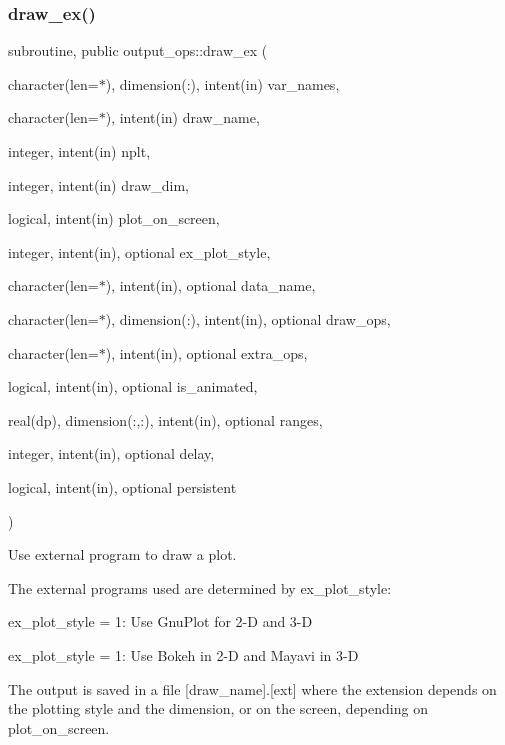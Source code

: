 \subsubsection{\texorpdfstring{draw\+\_\+ex()}{draw\_ex()}}
{\footnotesize\ttfamily subroutine, public output\+\_\+ops\+::draw\+\_\+ex (\begin{DoxyParamCaption}\item[{character(len=$\ast$), dimension(\+:), intent(in)}]{var\+\_\+names,  }\item[{character(len=$\ast$), intent(in)}]{draw\+\_\+name,  }\item[{integer, intent(in)}]{nplt,  }\item[{integer, intent(in)}]{draw\+\_\+dim,  }\item[{logical, intent(in)}]{plot\+\_\+on\+\_\+screen,  }\item[{integer, intent(in), optional}]{ex\+\_\+plot\+\_\+style,  }\item[{character(len=$\ast$), intent(in), optional}]{data\+\_\+name,  }\item[{character(len=$\ast$), dimension(\+:), intent(in), optional}]{draw\+\_\+ops,  }\item[{character(len=$\ast$), intent(in), optional}]{extra\+\_\+ops,  }\item[{logical, intent(in), optional}]{is\+\_\+animated,  }\item[{real(dp), dimension(\+:,\+:), intent(in), optional}]{ranges,  }\item[{integer, intent(in), optional}]{delay,  }\item[{logical, intent(in), optional}]{persistent }\end{DoxyParamCaption})}



Use external program to draw a plot. 

The external programs used are determined by {\ttfamily ex\+\_\+plot\+\_\+style\+:} 
\begin{DoxyItemize}
\item {\ttfamily ex\+\_\+plot\+\_\+style} = 1\+: Use Gnu\+Plot for 2-\/D and 3-\/D
\item {\ttfamily ex\+\_\+plot\+\_\+style} = 1\+: Use Bokeh in 2-\/D and Mayavi in 3-\/D
\end{DoxyItemize}

The output is saved in a file {\ttfamily \mbox{[}draw\+\_\+name\mbox{]}.\mbox{[}ext\mbox{]}} where the extension depends on the plotting style and the dimension, or on the screen, depending on {\ttfamily plot\+\_\+on\+\_\+screen}.

